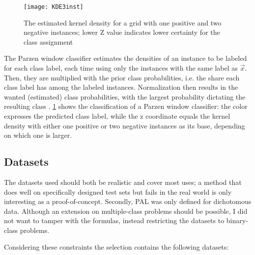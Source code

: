 \begin{figure}[h]
	\centering
	\texttt{[image: KDE3inst]}
	\caption{The estimated kernel density for a grid with one positive and two negative instances; lower Z value indicates lower certainty for the class assignment}
	\label{fig:KDE3inst}
\end{figure}

The Parzen window classifier estimates the densities of an instance to be labeled for each class label, each time using only the instances with the same label as $\vec{x}$. Then, they are multiplied with the prior class probabilities, i.e. the share each class label has among the labeled instances. Normalization then results in the wanted (estimated) class probabilities, with the largest probability dictating the resulting class \cite{ArchambeauEtAl2006}. \ref{fig:KDE3inst} shows the classification of a Parzen window classifier: the color expresses the predicted class label, while the z coordinate equals the kernel density with either one positive or two negative instances as its base, depending on which one is larger.

\subsection{Datasets}

The datasets used should both be realistic and cover most uses; a method that does well on specifically designed test sets but fails in the real world is only interesting as a proof-of-concept. Secondly, PAL was only defined for dichotomous data. Although an extension on multiple-class problems should be possible, I did not want to tamper with the formulas, instead restricting the datasets to binary-class problems.

Considering these constraints the selection contains the following datasets:

